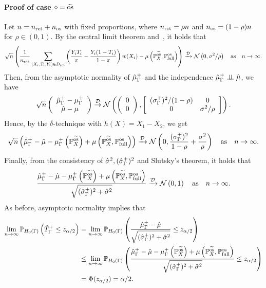 \paragraph{Proof of case $\diamond=\widetilde{\mathrm{os}}$}
Let $n=n_{\operatorname{rct}}+n_{\operatorname{os}}$ with fixed proportions, where $n_{\operatorname{rct}}=\rho n$ and $n_{\operatorname{os}}=(1-\rho)n$ for $\rho \in (0,1)$. By the central limit theorem and~, it holds that
$$
\sqrt{n}\left(\frac{1}{n_{\operatorname{rct}}}\sum_{\substack{(X_i,T_i,Y_i)  \in D_{\operatorname{rct}}}} \left(\frac{Y_iT_i}{\pi} - \frac{Y_i(1-T_i)}{1-\pi}  \right)w(X_i) - \mu\left(\mathbb{P}^{\widetilde{\mathrm{os}}}_X, \mathbb{P} ^{\operatorname{os}}_{\operatorname{full}} \right)\right)\xrightarrow{\mathcal{D}} \mathcal{N}\left(0, \sigma^2/\rho \right) \quad \text{as} \quad n \to \infty.$$
Then, from the asymptotic normality of $\hat{\mu}_\Gamma^+$ and the independence $\hat{\mu}_\Gamma^+\perp \!\!\! \perp \hat{\mu}$, we have
$$
\sqrt{n}\left(\begin{array}{c} \hat{\mu}_\Gamma^+ - \mu_\Gamma^+  \\\hat{\mu} - \mu \end{array}\right)
\stackrel{\mathcal{D}}{\rightarrow} \mathcal{N}\left(\left(\begin{array}{l}0 \\ 0 \end{array}\right),\left[\begin{array}{cc}(\sigma_\Gamma^+)^2/(1-\rho) & 0  \\ 0 & \sigma^2/\rho \end{array} \right]\right).
$$
Hence, by the $\delta$-technique with $h(X) = X_1 - X_2$, we get 
$$
\sqrt{n}\left(\hat{\mu}_\Gamma^+ - \hat{\mu} - \mu_\Gamma^+\left(\mathbb{P}^{\widetilde{\mathrm{os}}}_X \right) + \mu\left(\mathbb{P}^{\widetilde{\mathrm{os}}}_X, \mathbb{P} ^{\operatorname{os}}_{\operatorname{full}} \right)\right)\xrightarrow{\mathcal{D}} \mathcal{N} \left(0, \frac{(\sigma^+_\Gamma)^2}{1-\rho} + \frac{\sigma^2}{\rho} \right) \quad \text{as} \quad  n \to \infty.
$$
Finally, from the consistency of $\hat{\sigma}^2, (\hat{\sigma}^+_\Gamma)^2$ and Slutsky's theorem,  it holds that
$$
\frac{\hat{\mu}^{+}_\Gamma - \hat{\mu} - \mu_\Gamma^+\left(\mathbb{P}^{\widetilde{\mathrm{os}}}_X \right) + \mu\left(\mathbb{P}^{\widetilde{\mathrm{os}}}_X, \mathbb{P} ^{\operatorname{os}}_{\operatorname{full}} \right)}{\sqrt{(\hat{\sigma}^+_\Gamma)^2+ \hat{\sigma}^2}} \xrightarrow{\mathcal{D}}  \mathcal{N}\left(0, 1\right) \quad \text{as} \quad  n \to \infty.
$$
As before,  asymptotic normality implies that
\begin{align*}
\lim_{n\to \infty} \mathbb P_{H_0(\Gamma)} \left(\hat{T}_\Gamma^+  \leq z_{\alpha/2} \right)&= \lim_{n\to \infty} \mathbb P_{H_0(\Gamma)} \left(\frac{\hat{\mu}^{+}_\Gamma - \hat{\mu} }{\sqrt{(\hat{\sigma}^+_\Gamma)^2 + \hat{\sigma}^2} }  \leq z_{\alpha/2} \right)\\
&\leq \lim_{n\to \infty} \mathbb P_{H_0(\Gamma)}\left(\frac{\hat{\mu}^{+}_\Gamma - \hat{\mu} -\mu_\Gamma^+\left(\mathbb{P}^{\widetilde{\mathrm{os}}}_X \right) + \mu\left(\mathbb{P}^{\widetilde{\mathrm{os}}}_X, \mathbb{P} ^{\operatorname{os}}_{\operatorname{full}} \right) }{\sqrt{(\hat{\sigma}^+_\Gamma)^2 + \hat{\sigma}^2} }  \leq z_{\alpha/2} \right)
\\&= \Phi(z_{\alpha/2})=\alpha/2.
\end{align*}




